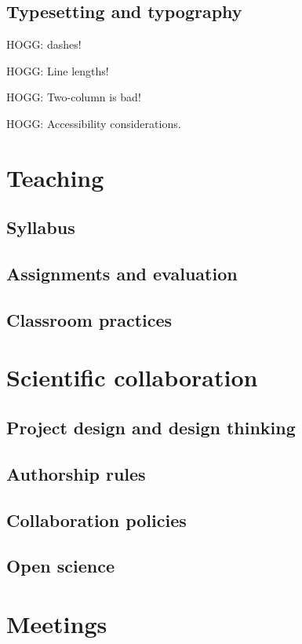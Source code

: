 \documentclass[letterpaper]{book}
\begin{document}
\chapter{Typesetting and typography}

HOGG: dashes!

HOGG: Line lengths!

HOGG: Two-column is bad!

HOGG: Accessibility considerations.

\part{Teaching}

\chapter{Syllabus}

\chapter{Assignments and evaluation}

\chapter{Classroom practices}

\part{Scientific collaboration}

\chapter{Project design and design thinking}

\chapter{Authorship rules}

\chapter{Collaboration policies}

\chapter{Open science}

\part{Meetings}
\end{document}
